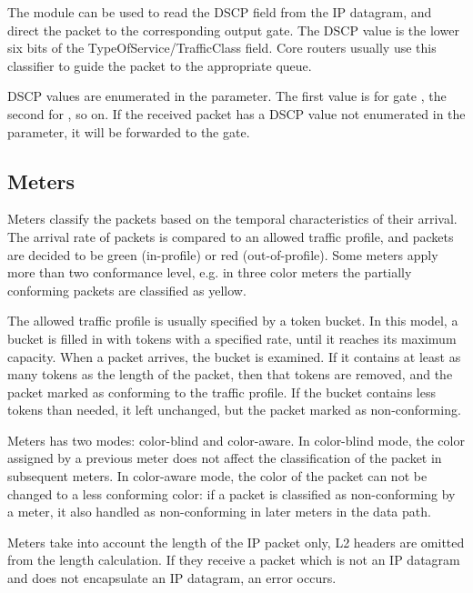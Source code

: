 The  module can be used to read
the DSCP field from the IP datagram, and direct the packet to
the corresponding output gate. The DSCP value is the lower
six bits of the TypeOfService/TrafficClass field. Core routers
usually use this classifier to guide the packet to the appropriate
queue.

DSCP values are enumerated in the  parameter.
The first value is for gate , the second for
, so on. If the received packet has a DSCP
value not enumerated in the  parameter, it will
be forwarded to the  gate.

\subsection{Meters}

Meters classify the packets based on the temporal characteristics
of their arrival. The arrival rate of packets is compared to an
allowed traffic profile, and packets are decided to be green
(in-profile) or red (out-of-profile). Some meters apply more than two
conformance level, e.g. in three color meters the partially conforming
packets are classified as yellow.

The allowed traffic profile is usually specified by a token bucket.
In this model, a bucket is filled in with tokens with a specified rate,
until it reaches its maximum capacity. When a packet arrives, the
bucket is examined. If it contains at least as many tokens as the
length of the packet, then that tokens are removed, and the packet
marked as conforming to the traffic profile. If the bucket contains
less tokens than needed, it left unchanged, but the packet marked
as non-conforming.

Meters has two modes: color-blind and color-aware.
In color-blind mode, the color assigned by a previous meter does not
affect the classification of the packet in subsequent meters.
In color-aware mode, the color of the packet can not be changed to a less
conforming color: if a packet is classified as non-conforming by a meter,
it also handled as non-conforming in later meters in the data path.

\begin{important}
Meters take into account the length of the IP packet only, L2 headers are omitted
from the length calculation. If they receive a packet which is not
an IP datagram and does not encapsulate an IP datagram, an error occurs.
\end{important}

